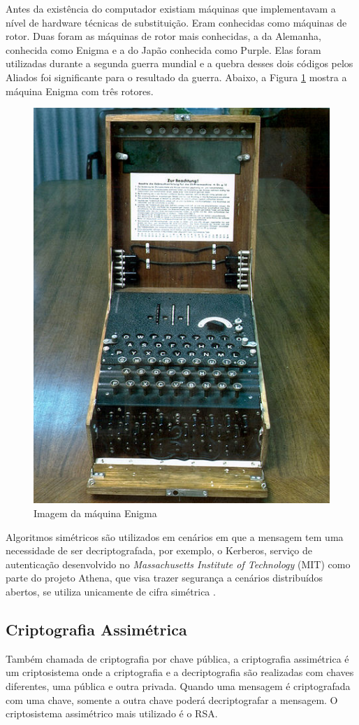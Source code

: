 Antes da existência do computador existiam máquinas que implementavam a nível de hardware técnicas de substituição. Eram conhecidas como máquinas de rotor. Duas foram as máquinas de rotor mais conhecidas, a da Alemanha, conhecida como Enigma e a do Japão conhecida como Purple. Elas foram utilizadas durante a segunda guerra mundial e a quebra desses dois códigos pelos Aliados foi significante para o resultado da guerra. Abaixo, a Figura \ref{fig:maqenigma} mostra a máquina Enigma com três rotores.

\begin{figure}[H]
    \centering
    \caption{Imagem da máquina Enigma}
    \label{fig:maqenigma}
    \includegraphics[width=.35\linewidth]{Figuras/MaqEnigma.jpg}
\end{figure}

Algoritmos simétricos são utilizados em cenários em que a mensagem tem uma necessidade de ser decriptografada, por exemplo, o Kerberos, serviço de autenticação desenvolvido no \textit{Massachusetts Institute of Technology} (MIT) como parte do projeto Athena, que visa trazer segurança a cenários distribuídos abertos, se utiliza unicamente de cifra simétrica \cite{stallings14} \cite{tanenbaum03}.

\subsection{Criptografia Assimétrica}
\label{subsec:criptografiaasync}
Também chamada de criptografia por chave pública, a criptografia assimétrica é um criptosistema onde a criptografia e a decriptografia são realizadas com chaves diferentes, uma pública e outra privada. Quando uma mensagem é criptografada com uma chave, somente a outra chave poderá decriptografar  a mensagem. O criptosistema assimétrico mais utilizado é o RSA.

